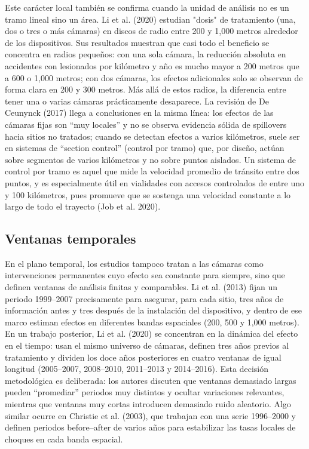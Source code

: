\indent Este carácter local también se confirma cuando la unidad de análisis no es un tramo lineal sino un área. Li et al. (2020) estudian "dosis" de tratamiento (una, dos o tres o más cámaras) en discos de radio entre 200 y 1,000 metros alrededor de los dispositivos. Sus resultados muestran que casi todo el beneficio se concentra en radios pequeños: con una sola cámara, la reducción absoluta en accidentes con lesionados por kilómetro y año es mucho mayor a 200 metros que a 600 o 1,000 metros; con dos cámaras, los efectos adicionales solo se observan de forma clara en 200 y 300 metros. Más allá de estos radios, la diferencia entre tener una o varias cámaras prácticamente desaparece. La revisión de De Ceunynck (2017) llega a conclusiones en la misma línea: los efectos de las cámaras fijas son “muy locales” y no se observa evidencia sólida de spillovers hacia sitios no tratados; cuando se detectan efectos a varios kilómetros, suele ser en sistemas de “section control” (control por tramo) que, por diseño, actúan sobre segmentos de varios kilómetros y no sobre puntos aislados. Un sistema de control por tramo es aquel que mide la velocidad promedio de tránsito entre dos puntos, y es especialmente útil en vialidades con accesos controlados de entre uno y 100 kilómetros, pues promueve que se sostenga una velocidad constante a lo largo de todo el trayecto (Job et al. 2020).

\subsection{Ventanas temporales}
\noindent En el plano temporal, los estudios tampoco tratan a las cámaras como intervenciones permanentes cuyo efecto sea constante para siempre, sino que definen ventanas de análisis finitas y comparables. Li et al. (2013) fijan un periodo 1999–2007 precisamente para asegurar, para cada sitio, tres años de información antes y tres después de la instalación del dispositivo, y dentro de ese marco estiman efectos en diferentes bandas espaciales (200, 500 y 1,000 metros). En un trabajo posterior, Li et al. (2020) se concentran en la dinámica del efecto en el tiempo: usan el mismo universo de cámaras, definen tres años previos al tratamiento y dividen los doce años posteriores en cuatro ventanas de igual longitud (2005–2007, 2008–2010, 2011–2013 y 2014–2016). Esta decisión metodológica es deliberada: los autores discuten que ventanas demasiado largas pueden “promediar” periodos muy distintos y ocultar variaciones relevantes, mientras que ventanas muy cortas introducen demasiado ruido aleatorio. Algo similar ocurre en Christie et al. (2003), que trabajan con una serie 1996–2000 y definen periodos before–after de varios años para estabilizar las tasas locales de choques en cada banda espacial.

